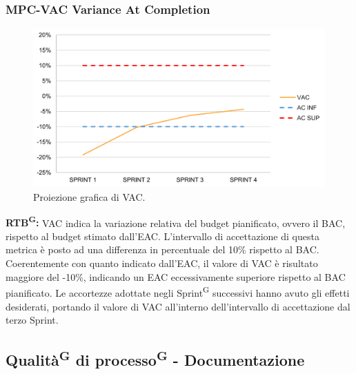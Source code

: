 \documentclass[8pt]{article}
\newcommand{\glossterm}[1]{#1\textsuperscript{G}} %
\begin{document}
\subsubsection{MPC-VAC Variance At Completion}
\begin{figure}[h!]
    \centering
    \includegraphics[width=1\textwidth]{images_pdq/VAC.png}
    \caption{Proiezione grafica di VAC.}
    \label{fig:Proiezione grafica di VAC}
\end{figure}
\textbf{\glossterm{RTB}:} VAC indica la variazione relativa del budget pianificato, ovvero il BAC, rispetto al budget stimato dall'EAC. L'intervallo di accettazione di questa metrica è posto ad una differenza in percentuale del 10\% rispetto al BAC.\\
Coerentemente con quanto indicato dall'EAC, il valore di VAC è risultato maggiore del -10\%, indicando un EAC eccessivamente superiore rispetto al BAC pianificato. Le accortezze adottate negli \glossterm{Sprint} successivi hanno avuto gli effetti desiderati, portando il valore di VAC all'interno dell'intervallo di accettazione dal terzo Sprint.
\clearpage
\subsection{\glossterm{Qualità} di \glossterm{processo} - Documentazione}
\end{document}
